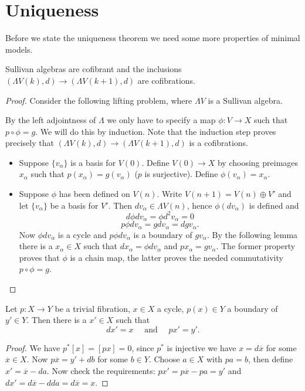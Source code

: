 \section{Uniqueness}

Before we state the uniqueness theorem we need some more properties of minimal models.

\begin{lemma}
	Sullivan algebras are cofibrant and the inclusions $(\Lambda V(k), d) \to (\Lambda V(k+1), d)$ are cofibrations.
\end{lemma}
\begin{proof}
	Consider the following lifting problem, where $\Lambda V$ is a Sullivan algebra.


	By the left adjointness of $\Lambda$ we only have to specify a map $\phi: V \to X$ such that $p \circ \phi = g$. We will do this by induction. Note that the induction step proves precisely that $(\Lambda V(k), d) \to (\Lambda V(k+1), d)$ is a cofibrations.
	\begin{itemize}
		\item Suppose $\{v_\alpha\}$ is a basis for $V(0)$. Define $V(0) \to X$ by choosing preimages $x_\alpha$ such that $p(x_\alpha) = g(v_\alpha)$ ($p$ is surjective). Define $\phi(v_\alpha) = x_\alpha$.
		\item Suppose $\phi$ has been defined on $V(n)$. Write $V(n+1) = V(n) \oplus V'$ and let $\{v_\alpha\}$ be a basis for $V'$. Then $dv_\alpha \in \Lambda V(n)$, hence $\phi(dv_\alpha)$ is defined and
		$$ d \phi d v_\alpha = \phi d^2 v_\alpha = 0 $$
		$$ p \phi d v_\alpha = g d v_\alpha = d g v_\alpha. $$
		Now $\phi d v_\alpha$ is a cycle and $p \phi d v_\alpha$ is a boundary of $g v_\alpha$. By the following lemma there is a $x_\alpha \in X$ such that $d x_\alpha = \phi d v_\alpha$ and $p x_\alpha = g v_\alpha$. The former property proves that $\phi$ is a chain map, the latter proves the needed commutativity $p \circ \phi = g$.
	\end{itemize}
\end{proof}

\begin{lemma}
	Let $p: X \to Y$ be a trivial fibration, $x \in X$ a cycle, $p(x) \in Y$ a boundary of $y' \in Y$. Then there is a $x' \in X$ such that
	$$ dx' = x \quad\text{ and }\quad px' = y'. $$
\end{lemma}
\begin{proof}
	We have $p^\ast [x] = [px] = 0$, since $p^\ast$ is injective we have $x = d \overline{x}$ for some $\overline{x} \in X$. Now $p \overline{x} = y' + db$ for some $b \in Y$. Choose $a \in X$ with $p a = b$, then define $x' = \overline{x} - da$. Now check the requirements: $p x' = p \overline{x} - p a = y'$ and $d x' = d \overline{x} - d d a = d \overline{x} = x$.
\end{proof}

